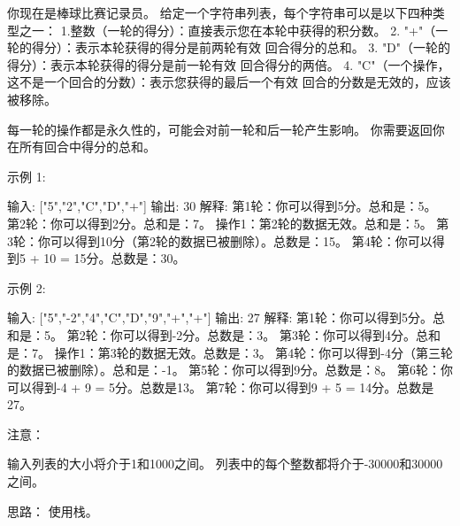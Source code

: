 你现在是棒球比赛记录员。
给定一个字符串列表，每个字符串可以是以下四种类型之一：
1.整数（一轮的得分）：直接表示您在本轮中获得的积分数。
2. "+"（一轮的得分）：表示本轮获得的得分是前两轮有效 回合得分的总和。
3. "D"（一轮的得分）：表示本轮获得的得分是前一轮有效 回合得分的两倍。
4. "C"（一个操作，这不是一个回合的分数）：表示您获得的最后一个有效 回合的分数是无效的，应该被移除。

每一轮的操作都是永久性的，可能会对前一轮和后一轮产生影响。
你需要返回你在所有回合中得分的总和。

示例 1:

输入: ["5","2","C","D","+"]
输出: 30
解释: 
第1轮：你可以得到5分。总和是：5。
第2轮：你可以得到2分。总和是：7。
操作1：第2轮的数据无效。总和是：5。
第3轮：你可以得到10分（第2轮的数据已被删除）。总数是：15。
第4轮：你可以得到5 + 10 = 15分。总数是：30。

示例 2:

输入: ["5","-2","4","C","D","9","+","+"]
输出: 27
解释: 
第1轮：你可以得到5分。总和是：5。
第2轮：你可以得到-2分。总数是：3。
第3轮：你可以得到4分。总和是：7。
操作1：第3轮的数据无效。总数是：3。
第4轮：你可以得到-4分（第三轮的数据已被删除）。总和是：-1。
第5轮：你可以得到9分。总数是：8。
第6轮：你可以得到-4 + 9 = 5分。总数是13。
第7轮：你可以得到9 + 5 = 14分。总数是27。

注意：

    输入列表的大小将介于1和1000之间。
    列表中的每个整数都将介于-30000和30000之间。





























思路：
使用栈。




































